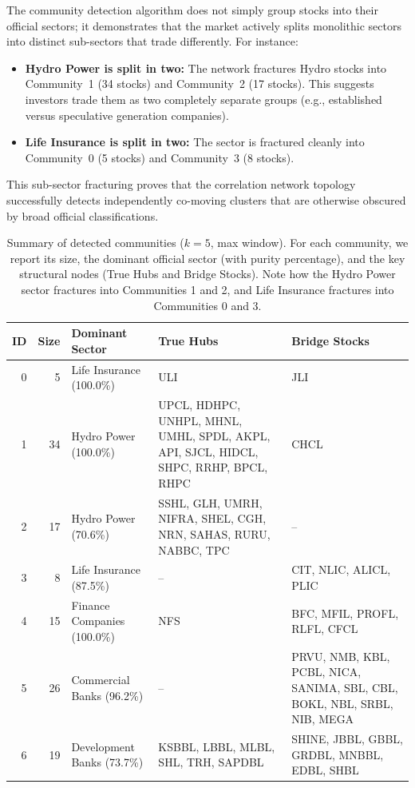 The community detection algorithm does not simply group stocks into their official sectors; it demonstrates that the market actively splits monolithic sectors into distinct sub-sectors that trade differently. For instance:
\begin{itemize}
  \item \textbf{Hydro Power is split in two:} The network fractures Hydro stocks into Community~1 (34 stocks) and Community~2 (17 stocks). This suggests investors trade them as two completely separate groups (e.g., established versus speculative generation companies).
  \item \textbf{Life Insurance is split in two:} The sector is fractured cleanly into Community~0 (5 stocks) and Community~3 (8 stocks).
\end{itemize}
This sub-sector fracturing proves that the correlation network topology successfully detects independently co-moving clusters that are otherwise obscured by broad official classifications.


\begin{table}[H]
\centering
\footnotesize
\caption{Summary of detected communities ($k=5$, max window). For each community, we report its size, the dominant official sector (with purity percentage), and the key structural nodes (True Hubs and Bridge Stocks). Note how the Hydro Power sector fractures into Communities 1 and 2, and Life Insurance fractures into Communities 0 and 3.}
\label{tab:community_summary}
\begin{tabular}{r r l p{3.5cm} p{3.5cm}}
\toprule
\textbf{ID} & \textbf{Size} & \textbf{Dominant Sector} & \textbf{True Hubs} & \textbf{Bridge Stocks} \\
\midrule
0 & 5 & Life Insurance (100.0\%) & ULI & JLI \\
1 & 34 & Hydro Power (100.0\%) & UPCL, HDHPC, UNHPL, MHNL, UMHL, SPDL, AKPL, API, SJCL, HIDCL, SHPC, RRHP, BPCL, RHPC & CHCL \\
2 & 17 & Hydro Power (70.6\%) & SSHL, GLH, UMRH, NIFRA, SHEL, CGH, NRN, SAHAS, RURU, NABBC, TPC & -- \\
3 & 8 & Life Insurance (87.5\%) & -- & CIT, NLIC, ALICL, PLIC \\
4 & 15 & Finance Companies (100.0\%) & NFS & BFC, MFIL, PROFL, RLFL, CFCL \\
5 & 26 & Commercial Banks (96.2\%) & -- & PRVU, NMB, KBL, PCBL, NICA, SANIMA, SBL, CBL, BOKL, NBL, SRBL, NIB, MEGA \\
6 & 19 & Development Banks (73.7\%) & KSBBL, LBBL, MLBL, SHL, TRH, SAPDBL & SHINE, JBBL, GBBL, GRDBL, MNBBL, EDBL, SHBL \\
\bottomrule
\end{tabular}
\end{table}

